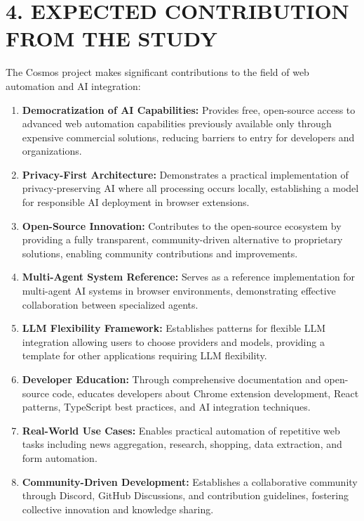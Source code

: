 \documentclass[12pt,a4paper]{article}
\begin{document}
\vspace{0.5cm}

\section*{\textbf{4. EXPECTED CONTRIBUTION FROM THE STUDY}}

The Cosmos project makes significant contributions to the field of web automation and AI integration:

\begin{enumerate}
    \item \textbf{Democratization of AI Capabilities:} Provides free, open-source access to advanced web automation capabilities previously available only through expensive commercial solutions, reducing barriers to entry for developers and organizations.
    
    \item \textbf{Privacy-First Architecture:} Demonstrates a practical implementation of privacy-preserving AI where all processing occurs locally, establishing a model for responsible AI deployment in browser extensions.
    
    \item \textbf{Open-Source Innovation:} Contributes to the open-source ecosystem by providing a fully transparent, community-driven alternative to proprietary solutions, enabling community contributions and improvements.
    
    \item \textbf{Multi-Agent System Reference:} Serves as a reference implementation for multi-agent AI systems in browser environments, demonstrating effective collaboration between specialized agents.
    
    \item \textbf{LLM Flexibility Framework:} Establishes patterns for flexible LLM integration allowing users to choose providers and models, providing a template for other applications requiring LLM flexibility.
    
    \item \textbf{Developer Education:} Through comprehensive documentation and open-source code, educates developers about Chrome extension development, React patterns, TypeScript best practices, and AI integration techniques.
    
    \item \textbf{Real-World Use Cases:} Enables practical automation of repetitive web tasks including news aggregation, research, shopping, data extraction, and form automation.
    
    \item \textbf{Community-Driven Development:} Establishes a collaborative community through Discord, GitHub Discussions, and contribution guidelines, fostering collective innovation and knowledge sharing.
\end{enumerate}
\end{document}
